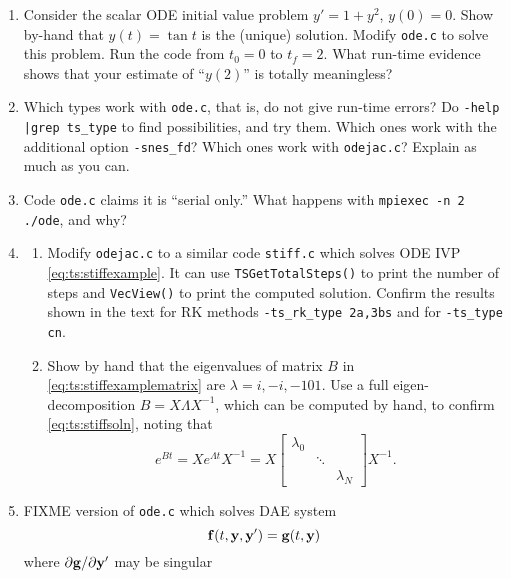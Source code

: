 \renewcommand{\labelenumi}{\arabic{chapter}.\arabic{enumi}\quad}
\renewcommand{\labelenumii}{(\alph{enumii})}
\begin{enumerate}
\item \label{exer:ts:tan}  Consider the scalar ODE initial value problem $y'=1+y^2$, $y(0)=0$.  Show by-hand that $y(t)=\tan t$ is the (unique) solution.  Modify \texttt{ode.c} to solve this problem.  Run the code from $t_0=0$ to $t_f=2$.  What run-time evidence shows that your estimate of ``$y(2)$'' is totally meaningless?

\item \label{exer:ts:odepossible} Which \pTS types work with \texttt{ode.c}, that is, do not give run-time errors?  Do \texttt{-help |grep ts\_type} to find possibilities, and try them.  Which ones work with the additional option \texttt{-snes\_fd}?  Which ones work with \texttt{odejac.c}?  Explain as much as you can.

\item \label{exer:ts:odeserial} Code \texttt{ode.c} claims it is ``serial only.''  What happens with \texttt{mpiexec -n 2 ./ode}, and why?

\item \label{exer:ts:stiffexample}
  \begin{enumerate}
  \item Modify \texttt{odejac.c} to a similar code \texttt{stiff.c} which solves ODE IVP \eqref{eq:ts:stiffexample}.  It can use \texttt{TSGetTotalSteps()} to print the number of steps and \texttt{VecView()} to print the computed solution.  Confirm the results shown in the text for RK methods \texttt{-ts\_rk\_type 2a,3bs} and for \texttt{-ts\_type cn}.
  \item Show by hand that the eigenvalues of matrix $B$ in \eqref{eq:ts:stiffexamplematrix} are $\lambda=i,-i,-101$.  Use a full eigen-decomposition $B = X \Lambda X^{-1}$, which can be computed by hand, to confirm \eqref{eq:ts:stiffsoln}, noting that
    $$e^{Bt} = X e^{\Lambda t} X^{-1} = X \begin{bmatrix} \lambda_0 &  &  \\
                       & \ddots &  \\
                       & & \lambda_N \end{bmatrix} X^{-1}.$$
  \end{enumerate}

\item FIXME version of \texttt{ode.c} which solves DAE system
    $$\mathbf{f}(t,\mathbf{y},\mathbf{y}') = \mathbf{g}(t,\mathbf{y})$$
where $\partial \mathbf{g}/\partial \mathbf{y}'$ may be singular


\end{enumerate}
